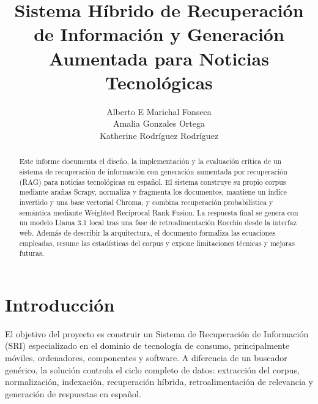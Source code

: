 \documentclass[a4paper]{llncs}
\begin{document}
\title{Sistema Híbrido de Recuperación de Información y Generación Aumentada para Noticias Tecnológicas}

\author{Alberto E Marichal Fonseca \\ Amalia Gonzales Ortega \\ Katherine Rodríguez Rodríguez  }


\maketitle

\begin{abstract}
Este informe documenta el diseño, la implementación y la evaluación crítica de un sistema de recuperación de información con generación aumentada por recuperación (RAG) para noticias tecnológicas en español. El sistema construye su propio corpus mediante arañas Scrapy, normaliza y fragmenta los documentos, mantiene un índice invertido y una base vectorial Chroma, y combina recuperación probabilística y semántica mediante Weighted Reciprocal Rank Fusion. La respuesta final se genera con un modelo Llama 3.1 local tras una fase de retroalimentación Rocchio desde la interfaz web. Además de describir la arquitectura, el documento formaliza las ecuaciones empleadas, resume las estadísticas del corpus y expone limitaciones técnicas y mejoras futuras.
\end{abstract}

\section{Introducción}

El objetivo del proyecto es construir un Sistema de Recuperación de Información (SRI) especializado en el dominio de tecnología de consumo, principalmente móviles, ordenadores, componentes y software. A diferencia de un buscador genérico, la solución controla el ciclo completo de datos: extracción del corpus, normalización, indexación, recuperación híbrida, retroalimentación de relevancia y generación de respuestas en español.
\end{document}
